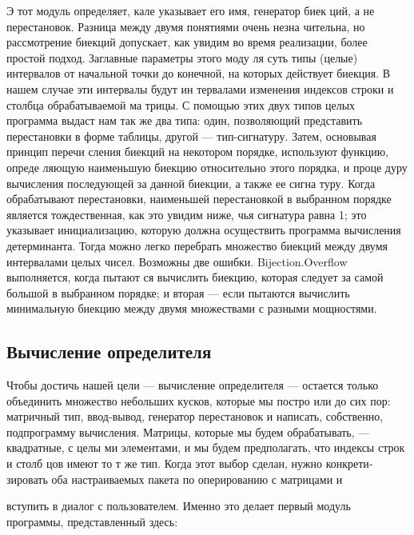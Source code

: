 Э тот модуль определяет, кале указывает его имя, генератор биек­
ций, а не перестановок. Разница между двумя понятиями очень незна­
чительна, но рассмотрение биекций допускает, как увидим во время
реализации, более простой подход. Заглавные параметры этого моду­
ля суть типы (целые) интервалов от начальной точки до конечной, на
которых действует биекция. В нашем случае эти интервалы будут ин­
тервалами изменения индексов строки и столбца обрабатываемой ма­
трицы. С помощью этих двух типов целых программа выдаст нам так­
же два типа: один, позволяющий представить перестановки в форме
таблицы, другой — тип-сигнатуру. Затем, основывая принцип перечи­
сления биекций на некотором порядке, используют функцию, опреде­
ляющую наименьшую биекцию относительно этого порядка, и проце­
дуру вычисления последующей за данной биекции, а также ее сигна­
туру. Когда обрабатывают перестановки, наименьшей перестановкой
в выбранном порядке является тождественная, как это увидим ниже,
чья сигнатура равна 1; это указывает инициализацию, которую должна
осуществить программа вычисления детерминанта. Тогда можно легко
перебрать множество биекций между двумя интервалами целых чисел.
Возможны две ошибки. Bijection.Overflow выполняется, когда пытают­
ся вычислить биекцию, которая следует за самой большой в выбранном
порядке; и вторая — если пытаются вычислить минимальную биекцию
между двумя множествами с разными мощностями.

\subsection{Вычисление определителя}
Чтобы достичь нашей цели — вычисление определителя — остается
только объединить множество небольших кусков, которые мы постро­
или до сих пор: матричный тип, ввод-вывод, генератор перестановок и
написать, собственно, подпрограмму вычисления.
Матрицы, которые мы будем обрабатывать, — квадратные, с целы­
ми элементами, и мы будем предполагать, что индексы строк и столб­
цов имеют то т же тип. Когда этот выбор сделан, нужно конкрети­
зировать оба настраиваемых пакета по оперированию с матрицами и

\newpage

вступить в диалог с пользователем. Именно это делает первый модуль
программы, представленный здесь:



